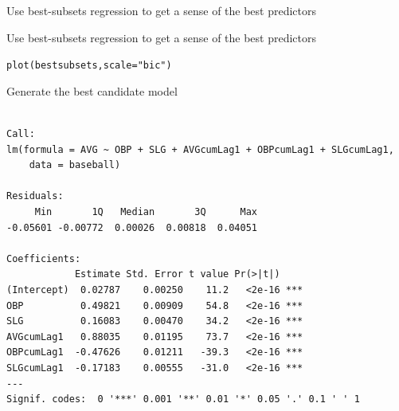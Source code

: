 \documentclass{beamer}\usepackage[]{graphicx}\usepackage[]{color}
\makeatletter
\newcommand{\hlstr}[1]{\textcolor[rgb]{1,0.894,0.71}{#1}}%
\newcommand{\hlstd}[1]{\textcolor[rgb]{1,0.894,0.769}{#1}}%
\newcommand{\hlkwc}[1]{\textcolor[rgb]{0.78,0.941,0.545}{#1}}%
\newcommand{\hlkwd}[1]{\textcolor[rgb]{1,0.78,0.769}{#1}}%
\newenvironment{kframe}{%
 \def\at@end@of@kframe{}%
 \ifinner\ifhmode%
  \def\at@end@of@kframe{\end{minipage}}%
  \begin{minipage}{\columnwidth}%
 \fi\fi%
 \def\FrameCommand##1{\hskip\@totalleftmargin \hskip-\fboxsep
 \colorbox{shadecolor}{##1}\hskip-\fboxsep
     \hskip-\linewidth \hskip-\@totalleftmargin \hskip\columnwidth}%
 \MakeFramed {\advance\hsize-\width
   \@totalleftmargin\z@ \linewidth\hsize
   \@setminipage}}%
 {\par\unskip\endMakeFramed%
 \at@end@of@kframe}
\newenvironment{knitrout}{}{} %
\makeatother
\begin{document}
\begin{darkframes}
\begin{frame}[fragile]{Use best-subsets regression to get a sense of the best predictors}
      \vspace{-1in}

\begin{knitrout}


\end{knitrout}
    \end{frame}


    \begin{frame}[fragile]{Use best-subsets regression to get a sense of the best predictors}
      \fontsize{9}{9}\selectfont
\begin{knitrout}
\begin{kframe}
\begin{alltt}
\hlkwd{plot}\hlstd{(bestsubsets,} \hlkwc{scale}\hlstd{=}\hlstr{"bic"}\hlstd{)}
\end{alltt}
\end{kframe}
\end{knitrout}

      \vspace{-1in}

\begin{knitrout}


\end{knitrout}
      \lc %
    \end{frame}     


    \begin{frame}[fragile]{Generate the best candidate model}
      \fontsize{8}{8}\selectfont 
\begin{knitrout}
\begin{kframe}
\begin{verbatim}

Call:
lm(formula = AVG ~ OBP + SLG + AVGcumLag1 + OBPcumLag1 + SLGcumLag1, 
    data = baseball)

Residuals:
     Min       1Q   Median       3Q      Max 
-0.05601 -0.00772  0.00026  0.00818  0.04051 

Coefficients:
            Estimate Std. Error t value Pr(>|t|)    
(Intercept)  0.02787    0.00250    11.2   <2e-16 ***
OBP          0.49821    0.00909    54.8   <2e-16 ***
SLG          0.16083    0.00470    34.2   <2e-16 ***
AVGcumLag1   0.88035    0.01195    73.7   <2e-16 ***
OBPcumLag1  -0.47626    0.01211   -39.3   <2e-16 ***
SLGcumLag1  -0.17183    0.00555   -31.0   <2e-16 ***
---
Signif. codes:  0 '***' 0.001 '**' 0.01 '*' 0.05 '.' 0.1 ' ' 1


\end{verbatim}
\end{kframe}
\end{knitrout}
\end{frame}
\end{darkframes}
\end{document}
